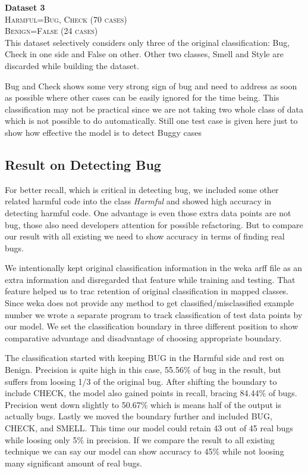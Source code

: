 \documentclass[nocopyrightspace]{sigplanconf}
\begin{document}
\vspace{10 pt}
\noindent
\textbf{Dataset 3}\\
\textsc{Harmful=Bug, Check (70 cases)}\\
\textsc{Benign=False (24 cases)}\\

\noindent
This dataset selectively considers only three of the original classification: Bug, Check in one side and False on other. Other two classes, Smell and Style are discarded while building the dataset.

\noindent
Bug and Check shows some very strong sign of bug and need to address as soon as possible where other cases can be easily ignored for the time being. This classification may not be practical since we are not taking two whole class of data which is not possible to do automatically. Still one test case is given here just to show how effective the model is to detect Buggy cases

\subsection{Result on Detecting Bug}
For better recall, which is critical in detecting bug, we included some other related harmful code into the class \emph{Harmful} and showed high accuracy in detecting harmful code. One advantage is even those extra data points are not bug, those also need developers attention for possible refactoring. But to compare our result with all existing we need to show accuracy in terms of finding real bugs.

We intentionally kept original classification information in the weka arff file as an extra information and disregarded that feature while training and testing. That feature helped us to trac retention of original classification in mapped classes. Since weka does not provide any method to get classified/misclassified example number we wrote a separate program to track classification of test data points by our model. We set the classification boundary in three different position to show comparative advantage and disadvantage of choosing appropriate boundary.

The classification started with keeping BUG in the Harmful side and rest on Benign. Precision is quite high in this case, 55.56\% of bug in the result, but suffers from loosing 1/3 of the original bug. After shifting the boundary to include CHECK, the model also gained points in recall, bracing 84.44\% of bugs. Precision went down slightly to 50.67\% which is means half of the output is actually bugs. Lastly we moved the boundary further and included BUG, CHECK, and SMELL. This time our model could retain 43 out of 45 real bugs while loosing only 5\% in precision. If we compare the result to all existing technique we can say our model can show accuracy to 45\% while not loosing many significant amount of real bugs.
\end{document}
